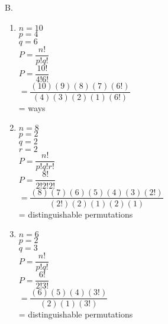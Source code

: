 B.  

\begin{enumerate}[label = \arabic*. ]
\item %
$n= 10$ \redcheck \\
$p=4 $ \redcheck \\
$q= 6$ \redcheck \\
$P= \dfrac{n!}{p!q!} $ \redcheck \\
$P= \dfrac{10!}{4!6!} $ \redcheck \\
$= \dfrac{(10)(9)(8)(7)(6!)}{(4)(3)(2)(1)(6!)} $ \redcheck \\
= \redcheck 
ways \redcheck 
 
\item %
$n=8 $ \redcheck \\
$p= 2$ \redcheck \\
$q= 2$ \redcheck \\
$r=2 $ \redcheck \\
$P= \dfrac{n!}{p!q!r!} $ \redcheck \\
$P= \dfrac{8!}{2!2!2!} $ \redcheck \\
$= \dfrac{(8)(7)(6)(5)(4)(3)(2!)}{(2!)(2)(1)(2)(1)} $ \redcheck \\
= \redcheck 
distinguishable permutations \redcheck 
 
\item %
$n= 6$ \redcheck \\
$p= 2$ \redcheck \\
$q= 3$ \redcheck \\
$P= \dfrac{n!}{p!q!} $ \redcheck \\
$P= \dfrac{6!}{2!3!} $ \redcheck \\
$= \dfrac{(6)(5)(4)(3!)}{(2)(1)(3!)} $ \redcheck \\
= \redcheck 
distinguishable permutations \redcheck 
 
\end{enumerate}  



 
